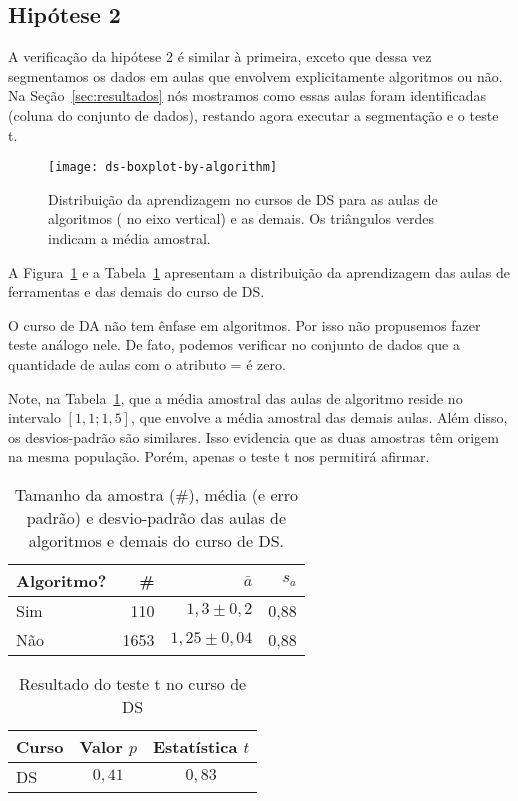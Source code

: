 \subsection{Hipótese 2}

A verificação da hipótese 2 é similar à primeira, exceto que dessa vez segmentamos os dados em aulas que envolvem explicitamente algoritmos ou não.
Na Seção~\ref{sec:resultados} nós mostramos como essas aulas foram identificadas (coluna  do conjunto de dados), restando agora executar a segmentação e o teste t.

\begin{figure}
	\centering
	\texttt{[image: ds-boxplot-by-algorithm]}
	\caption{Distribuição da aprendizagem no cursos de DS para as aulas de algoritmos ( no eixo vertical) e as demais. Os triângulos verdes indicam a média amostral.}
	\label{fig:dist-hipotese-2}
\end{figure}

A Figura~\ref{fig:dist-hipotese-2} e a Tabela~\ref{tab:dist-hipotese-2} apresentam a distribuição da aprendizagem das aulas de ferramentas e das demais do curso de DS.

O curso de DA não tem ênfase em algoritmos.
Por isso não propusemos fazer teste análogo nele.
De fato, podemos verificar no conjunto de dados que a quantidade de aulas com o atributo  =  é zero.

Note, na Tabela~\ref{tab:dist-hipotese-2}, que a média amostral das aulas de algoritmo reside no intervalo $[1,1; 1,5]$, que envolve a média amostral das demais aulas.
Além disso, os desvios-padrão são similares.
Isso evidencia que as duas amostras têm origem na mesma população.
Porém, apenas o teste t nos permitirá afirmar.

\begin{table}
	\centering
	\caption{Tamanho da amostra (\#), média (e erro padrão) e desvio-padrão das aulas de algoritmos e demais do curso de DS.}
	\label{tab:dist-hipotese-2}
	\begin{tabular}{lrrr}
		\toprule
		Algoritmo? & \# & $\bar{a}$ & $s_a$ \\
		\midrule
		Sim &  110 &  $1,3\pm 0,2$ & 0,88 \\
		Não & 1653 & $1,25\pm 0,04$ & 0,88 \\
		\bottomrule
	\end{tabular}
\end{table}

\begin{table}
	\centering
	\caption{Resultado do teste t no curso de DS}
	\begin{tabular}{lcc}
	\toprule
	Curso & Valor $p$   & Estatística $t$ \\
	\midrule
	DS    & $0,41$      & $0,83$ \\ 
	\bottomrule
	\end{tabular}
\end{table}

